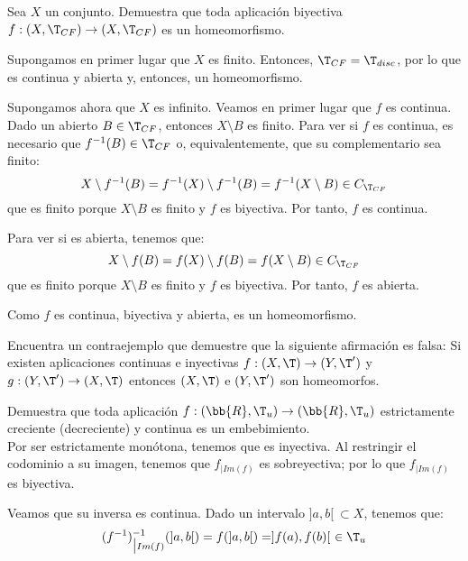 \begin{ejercicio}
    Sea $X$ un conjunto. Demuestra que toda aplicación biyectiva $f : (X, \T_{CF}) \to (X, \T_{CF})$ es un homeomorfismo.

    Supongamos en primer lugar que $X$ es finito. Entonces, $\T_{CF}=\T_{disc}$, por lo que es continua y abierta y, entonces, un homeomorfismo.

    Supongamos ahora que $X$ es infinito. Veamos en primer lugar que $f$ es continua. Dado un abierto $B\in \T_{CF}$, entonces $X\setminus B$ es finito. Para ver si $f$ es continua, es necesario que $f^{-1}(B)\in \T_{CF}$ o, equivalentemente, que su complementario sea finito:
    \begin{equation*}
        X\setminus f^{-1}(B) = f^{-1}(X)\setminus f^{-1}(B) = f^{-1}(X\setminus B) \in C_{\T_{CF}}
    \end{equation*}
    que es finito porque $X\setminus B$ es finito y $f$ es biyectiva. Por tanto, $f$ es continua.
    
    Para ver si es abierta, tenemos que:
    \begin{equation*}
        X\setminus f(B) = f(X)\setminus f(B) = f(X\setminus B) \in C_{\T_{CF}}
    \end{equation*}
    que es finito porque $X\setminus B$ es finito y $f$ es biyectiva. Por tanto, $f$ es abierta.

    Como $f$ es continua, biyectiva y abierta, es un homeomorfismo.
\end{ejercicio}

\begin{ejercicio}
    Encuentra un contraejemplo que demuestre que la siguiente afirmación es falsa: Si existen aplicaciones continuas e inyectivas $f : (X,\T) \to (Y, \T')$ y $g : (Y, \T') \to (X,\T)$ entonces $(X,\T)$ e $(Y, \T')$ son homeomorfos.
\end{ejercicio}

\begin{ejercicio}
    Demuestra que toda aplicación $f : (\bb{R}, \T_u) \to (\bb{R}, \T_u)$ estrictamente creciente (decreciente) y continua es un embebimiento.\\

    Por ser estrictamente monótona, tenemos que es inyectiva. Al restringir el codominio a su imagen, tenemos que $f_{\big| Im(f)}$ es sobreyectiva; por lo que $f_{\big| Im(f)}$ es biyectiva.

    Veamos que su inversa es continua. Dado un intervalo $]a,b[~\subset X$, tenemos que:
    \begin{equation*}
        (f^{-1})_{\big| Im(f)}^{-1}(]a,b[) = f(]a,b[)= ]f(a),f(b)[~ \in \T_u
    \end{equation*}
    
\end{ejercicio}


